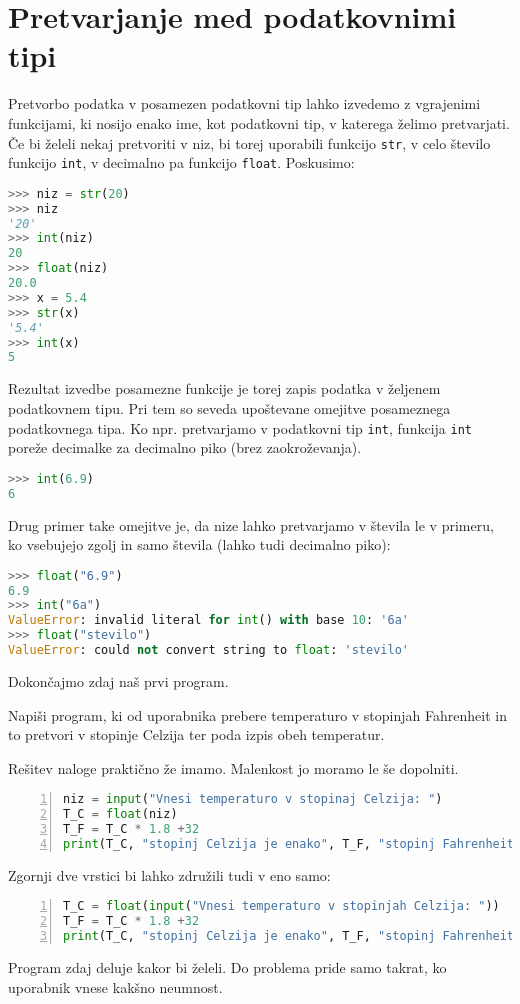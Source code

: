 \section{Pretvarjanje med podatkovnimi tipi}
Pretvorbo podatka v posamezen podatkovni tip lahko izvedemo z vgrajenimi funkcijami, ki nosijo enako ime, kot podatkovni tip, v katerega želimo pretvarjati. Če bi želeli nekaj pretvoriti v niz, bi torej uporabili funkcijo \texttt{str}, v celo število funkcijo \texttt{int}, v decimalno pa funkcijo \texttt{float}. Poskusimo:
\begin{lstlisting}[language=Python, showstringspaces=false]
>>> niz = str(20)
>>> niz
'20'
>>> int(niz)
20
>>> float(niz)
20.0
>>> x = 5.4
>>> str(x)
'5.4'
>>> int(x)
5
\end{lstlisting}
Rezultat izvedbe posamezne funkcije je torej zapis podatka v željenem podatkovnem tipu. Pri tem so seveda upoštevane omejitve posameznega podatkovnega tipa. Ko npr. pretvarjamo v podatkovni tip \texttt{int}, funkcija \texttt{int} poreže decimalke za decimalno piko (brez zaokroževanja). 
\begin{lstlisting}[language=Python, showstringspaces=false]
>>> int(6.9)
6
\end{lstlisting}
Drug primer take omejitve je, da nize lahko pretvarjamo v števila le v primeru, ko vsebujejo zgolj in samo števila (lahko tudi decimalno piko):
\begin{lstlisting}[language=Python, showstringspaces=false]
>>> float("6.9")
6.9
>>> int("6a")
ValueError: invalid literal for int() with base 10: '6a'
>>> float("stevilo")
ValueError: could not convert string to float: 'stevilo'
\end{lstlisting}

Dokončajmo zdaj naš prvi program.
\begin{zgled}
Napiši program, ki od uporabnika prebere temperaturo v stopinjah Fahrenheit in to pretvori v stopinje Celzija ter poda izpis obeh temperatur.
\end{zgled}
\begin{resitev}
Rešitev naloge praktično že imamo. Malenkost jo moramo le še dopolniti.
\begin{lstlisting}[language=Python, showstringspaces=false,numbers=left]
niz = input("Vnesi temperaturo v stopinaj Celzija: ")
T_C = float(niz)
T_F = T_C * 1.8 +32
print(T_C, "stopinj Celzija je enako", T_F, "stopinj Fahrenheit.")
\end{lstlisting}
Zgornji dve vrstici bi lahko združili tudi v eno samo:
\begin{lstlisting}[language=Python, showstringspaces=false,numbers=left]
T_C = float(input("Vnesi temperaturo v stopinjah Celzija: "))
T_F = T_C * 1.8 +32
print(T_C, "stopinj Celzija je enako", T_F, "stopinj Fahrenheit.")
\end{lstlisting}
\end{resitev}
Program zdaj deluje kakor bi želeli. Do problema pride samo takrat, ko uporabnik vnese kakšno neumnost.

